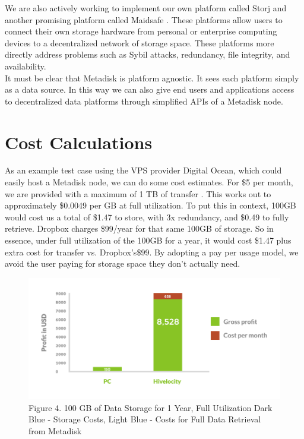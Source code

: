 \documentclass[a4paper,12pt]{article}
\begin{document}
We are also actively working to implement our own platform called Storj \cite{7} and another promising platform called Maidsafe \cite{1}. These platforms allow users to connect their own storage hardware from personal or enterprise computing devices to a decentralized network of storage space. These platforms more directly address problems such as Sybil attacks, redundancy, file integrity, and availability.  \\

It must be clear that Metadisk is platform agnostic. It sees each platform simply as a data source. In this way we can also give end users and applications access to decentralized data platforms through simplified APIs of a Metadisk node. 

\section*{Cost Calculations}

As an example test case using the VPS provider Digital Ocean, which could easily host a Metadisk node, we can do some cost estimates. For \$5 per month, we are provided with a maximum of 1 TB of transfer \cite{8}. This works out to approximately \$0.0049 per GB at full utilization. To put this in context, 100GB would cost us a total of \$1.47 to store, with 3x redundancy, and \$0.49 to fully retrieve.  Dropbox charges \$99/year for that same 100GB of storage. So in essence, under full utilization of the 100GB for a year, it would cost \$1.47 plus extra cost for transfer vs. Dropbox’s\$99.  By adopting a pay per usage model, we avoid the user  paying for storage space they don’t actually need.\\

\begin{figure}[h!]
  \centering
      \includegraphics[width=\linewidth]{05}
  \caption{Figure 4. 100 GB of Data Storage for 1 Year, Full Utilization
Dark Blue - Storage Costs, Light Blue - Costs for Full Data Retrieval from Metadisk}
\end{figure}
\end{document}
